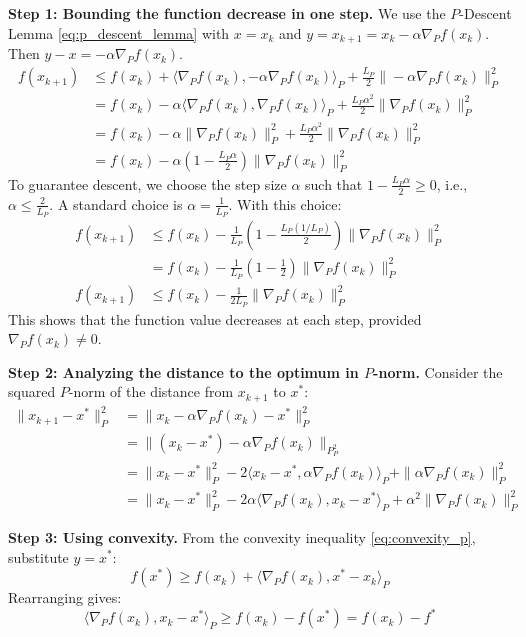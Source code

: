 \documentclass{article}
\newcommand{\normp}[1]{\|#1\|_P}       %
\newcommand{\gradp}{\nabla_P}
\newcommand{\ipp}[2]{\langle #1, #2 \rangle_P} %
\begin{document}
\textbf{Step 1: Bounding the function decrease in one step.}
We use the $P$-Descent Lemma \eqref{eq:p_descent_lemma} with $x = x_k$ and $y = x_{k+1} = x_k - \alpha \gradp f(x_k)$. Then $y - x = -\alpha \gradp f(x_k)$.
\begin{align*}
    f(x_{k+1}) &\le f(x_k) + \ipp{\gradp f(x_k)}{-\alpha \gradp f(x_k)} + \frac{L_P}{2} \normp{-\alpha \gradp f(x_k)}^2 \\
    &= f(x_k) - \alpha \ipp{\gradp f(x_k)}{\gradp f(x_k)} + \frac{L_P \alpha^2}{2} \normp{\gradp f(x_k)}^2 \\
    &= f(x_k) - \alpha \normp{\gradp f(x_k)}^2 + \frac{L_P \alpha^2}{2} \normp{\gradp f(x_k)}^2 \\
    &= f(x_k) - \alpha \left( 1 - \frac{L_P \alpha}{2} \right) \normp{\gradp f(x_k)}^2
\end{align*}
To guarantee descent, we choose the step size $\alpha$ such that $1 - \frac{L_P \alpha}{2} \ge 0$, i.e., $\alpha \le \frac{2}{L_P}$. A standard choice is $\alpha = \frac{1}{L_P}$. With this choice:
\begin{align}
    f(x_{k+1}) &\le f(x_k) - \frac{1}{L_P} \left( 1 - \frac{L_P (1/L_P)}{2} \right) \normp{\gradp f(x_k)}^2 \nonumber \\
    &= f(x_k) - \frac{1}{L_P} \left( 1 - \frac{1}{2} \right) \normp{\gradp f(x_k)}^2 \nonumber \\
    f(x_{k+1}) &\le f(x_k) - \frac{1}{2 L_P} \normp{\gradp f(x_k)}^2 \label{eq:func_decrease_p}
\end{align}
This shows that the function value decreases at each step, provided $\gradp f(x_k) \neq 0$.

\textbf{Step 2: Analyzing the distance to the optimum in $P$-norm.}
Consider the squared $P$-norm of the distance from $x_{k+1}$ to $x^*$:
\begin{align*}
    \normp{x_{k+1} - x^*}^2 &= \normp{x_k - \alpha \gradp f(x_k) - x^*}^2 \\
    &= \normp{(x_k - x^*) - \alpha \gradp f(x_k)}_P^2 \\
    &= \normp{x_k - x^*}^2 - 2 \ipp{x_k - x^*}{\alpha \gradp f(x_k)} + \normp{\alpha \gradp f(x_k)}^2 \\
    &= \normp{x_k - x^*}^2 - 2 \alpha \ipp{\gradp f(x_k)}{x_k - x^*} + \alpha^2 \normp{\gradp f(x_k)}^2
\end{align*}

\textbf{Step 3: Using convexity.}
From the convexity inequality \eqref{eq:convexity_p}, substitute $y = x^*$:
\begin{equation*}
    f(x^*) \ge f(x_k) + \ipp{\gradp f(x_k)}{x^* - x_k}
\end{equation*}
Rearranging gives:
\begin{equation} \label{eq:convex_for_dist_p}
    \ipp{\gradp f(x_k)}{x_k - x^*} \ge f(x_k) - f(x^*) = f(x_k) - f^*
\end{equation}
\end{document}
